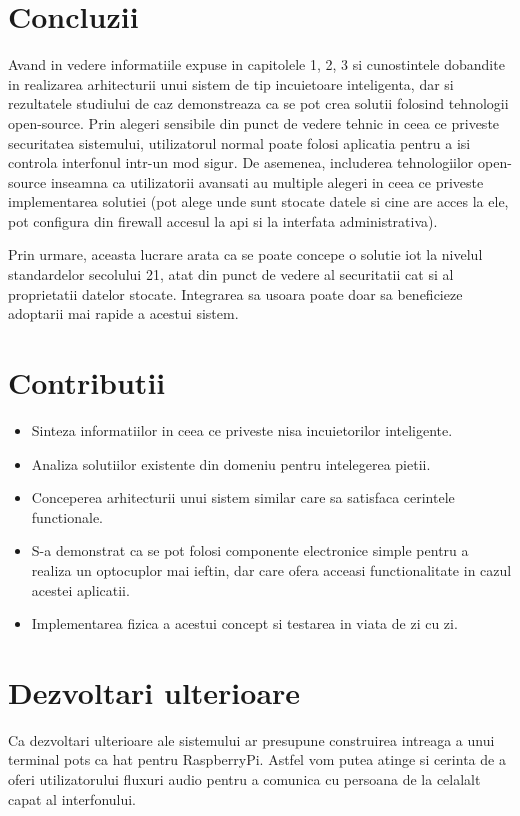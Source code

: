 \section{Concluzii}

Avand in vedere informatiile expuse in capitolele 1, 2, 3 si cunostintele dobandite in realizarea arhitecturii unui sistem de tip incuietoare inteligenta, dar si rezultatele studiului de caz demonstreaza ca se pot crea solutii folosind tehnologii open-source. Prin alegeri sensibile din punct de vedere tehnic in ceea ce priveste securitatea sistemului, utilizatorul normal poate folosi aplicatia pentru a isi controla interfonul intr-un mod sigur. De asemenea, includerea tehnologiilor open-source inseamna ca utilizatorii avansati au multiple alegeri in ceea ce priveste implementarea solutiei (pot alege unde sunt stocate datele si cine are acces la ele, pot configura din firewall accesul la \acrshort{api} si la interfata administrativa).

Prin urmare, aceasta lucrare arata ca se poate concepe o solutie \acrshort{iot} la nivelul standardelor secolului 21, atat din punct de vedere al securitatii cat si al proprietatii datelor stocate. Integrarea sa usoara poate doar sa beneficieze adoptarii mai rapide a acestui sistem.

\section{Contributii}

\begin{itemize}
  \item Sinteza informatiilor in ceea ce priveste nisa incuietorilor inteligente.
  \item Analiza solutiilor existente din domeniu pentru intelegerea pietii.
  \item Conceperea arhitecturii unui sistem similar care sa satisfaca cerintele functionale.
  \item S-a demonstrat ca se pot folosi componente electronice simple pentru a realiza un optocuplor mai ieftin, dar care ofera acceasi functionalitate in cazul acestei aplicatii.
  \item Implementarea fizica a acestui concept si testarea in viata de zi cu zi.
\end{itemize}

\section{Dezvoltari ulterioare}

Ca dezvoltari ulterioare ale sistemului ar presupune construirea intreaga a unui terminal \acrshort{pots} ca \acrshort{hat} pentru RaspberryPi. Astfel vom putea atinge si cerinta de a oferi utilizatorului fluxuri audio pentru a comunica cu persoana de la celalalt capat al interfonului. 
